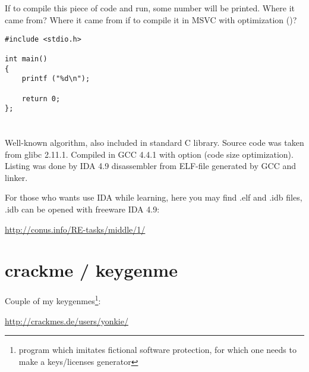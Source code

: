 \subsection{}

{If to compile this piece of code and run, some number will be printed. Where it came from?
Where it came from if to compile it in MSVC with optimization (\Ox)?}

\begin{lstlisting}
#include <stdio.h>

int main()
{
	printf ("%d\n");

	return 0;
};
\end{lstlisting}

\section{}

\subsection{}

{Well-known algorithm, also included in standard C library. Source code was taken from glibc 2.11.1.
Compiled in GCC 4.4.1 with  option (code size optimization).
Listing was done by IDA 4.9 disassembler from ELF-file generated by GCC and linker.}

{For those who wants use IDA while learning, here you may find .elf and .idb files,
.idb can be opened with freeware IDA 4.9:}

\url{http://conus.info/RE-tasks/middle/1/}



\section{crackme / keygenme}

{Couple of my keygenmes\footnote{program which imitates fictional software protection, 
for which one needs to make a keys/licenses generator}:}

\url{http://crackmes.de/users/yonkie/}

